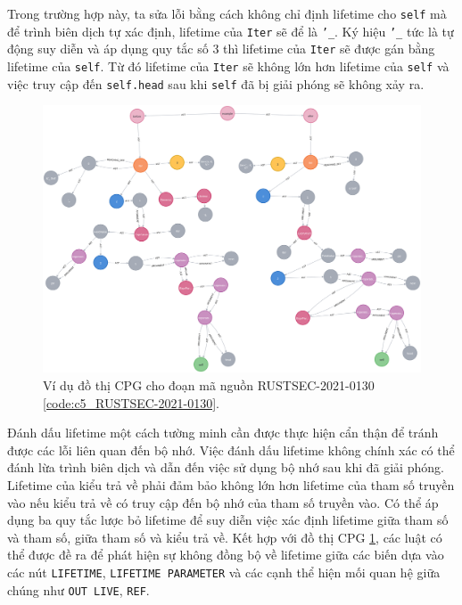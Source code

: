 Trong trường hợp này, ta sửa lỗi bằng cách không chỉ định lifetime cho \texttt{self} mà để trình biên dịch tự xác định, lifetime của \texttt{Iter} sẽ để là \texttt{'\_}.
Ký hiệu \texttt{'\_} tức là tự động suy diễn và áp dụng quy tắc số 3 thì lifetime của \texttt{Iter} sẽ được gán bằng lifetime của \texttt{self}.
Từ đó lifetime của \texttt{Iter} sẽ không lớn hơn lifetime của \texttt{self} và việc truy cập đến \texttt{self.head} sau khi \texttt{self} đã bị giải phóng sẽ không xảy ra.

\begin{figure}[H]
    \includegraphics[width=1\columnwidth]{figures/c5/c5_RUSTSEC-2021-0130.png}
    \centering
    \caption{Ví dụ đồ thị CPG cho đoạn mã nguồn RUSTSEC-2021-0130 \ref{code:c5_RUSTSEC-2021-0130}.}
    \label{img:c5_RUSTSEC-2021-0130}
\end{figure}

Đánh dấu lifetime một cách tường minh cần được thực hiện cẩn thận để tránh được các lỗi liên quan đến bộ nhớ.
Việc đánh dấu lifetime không chính xác có thể đánh lừa trình biên dịch và dẫn đến việc sử dụng bộ nhớ sau khi đã giải phóng.
Lifetime của kiểu trả về phải đảm bảo không lớn hơn lifetime của tham số truyền vào nếu kiểu trả về có truy cập đến bộ nhớ của tham số truyền vào.
Có thể áp dụng ba quy tắc lược bỏ lifetime để suy diễn việc xác định lifetime giữa tham số và tham số, giữa tham số và kiểu trả về.
Kết hợp với đồ thị CPG \ref{img:c5_RUSTSEC-2021-0130}, các luật có thể được đề ra để phát hiện sự không đồng bộ về lifetime giữa các biến dựa vào các nút \texttt{LIFETIME},
\texttt{LIFETIME PARAMETER} và các cạnh thể hiện mối quan hệ giữa chúng như \texttt{OUT LIVE}, \texttt{REF}.
